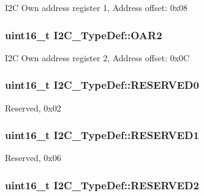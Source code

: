 I2\-C Own address register 1, Address offset\-: 0x08 \hypertarget{struct_i2_c___type_def_a03189e2a57c81ae5d103739b72f52c93}{
\subsubsection[{O\-A\-R2}]{ uint16\-\_\-t I2\-C\-\_\-\-Type\-Def\-::\-O\-A\-R2}}\label{struct_i2_c___type_def_a03189e2a57c81ae5d103739b72f52c93}
I2\-C Own address register 2, Address offset\-: 0x0\-C \hypertarget{struct_i2_c___type_def_aee6ec4cf81ee0bb5b038576ba0d738a2}{
\subsubsection[{R\-E\-S\-E\-R\-V\-E\-D0}]{\setlength{\rightskip}{0pt plus 5cm}uint16\-\_\-t I2\-C\-\_\-\-Type\-Def\-::\-R\-E\-S\-E\-R\-V\-E\-D0}}\label{struct_i2_c___type_def_aee6ec4cf81ee0bb5b038576ba0d738a2}
Reserved, 0x02 \hypertarget{struct_i2_c___type_def_a6c3d147223993f2b832b508ee5a5178e}{
\subsubsection[{R\-E\-S\-E\-R\-V\-E\-D1}]{\setlength{\rightskip}{0pt plus 5cm}uint16\-\_\-t I2\-C\-\_\-\-Type\-Def\-::\-R\-E\-S\-E\-R\-V\-E\-D1}}\label{struct_i2_c___type_def_a6c3d147223993f2b832b508ee5a5178e}
Reserved, 0x06 \hypertarget{struct_i2_c___type_def_a5e98c83a176deeb4a8a68f9ca12fdfd2}{
\subsubsection[{R\-E\-S\-E\-R\-V\-E\-D2}]{\setlength{\rightskip}{0pt plus 5cm}uint16\-\_\-t I2\-C\-\_\-\-Type\-Def\-::\-R\-E\-S\-E\-R\-V\-E\-D2}}\label{struct_i2_c___type_def_a5e98c83a176deeb4a8a68f9ca12fdfd2}
